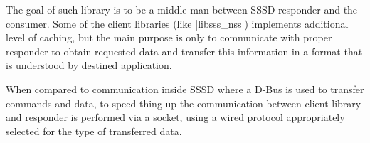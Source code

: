 The goal of such library is to be a middle-man between SSSD responder and the
consumer. Some of the client libraries (like |libsss_nss|) implements additional
level of caching, but the main purpose is only to communicate with proper
responder to obtain requested data and transfer this information in a format
that is understood by destined application.

When compared to communication inside SSSD where a D-Bus is used to transfer
commands and data, to speed thing up the communication between client library
and responder is performed via a socket, using a wired protocol appropriately
selected for the type of transferred data.
